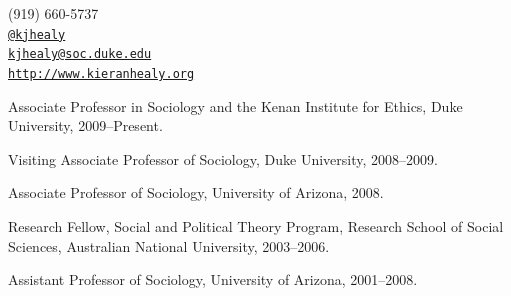 \documentclass[11pt,article,oneside]{memoir}
\makeatletter
\def\myemail{kjhealy@soc.duke.edu}
\def\myweb{http://www.kieranhealy.org}
\def\myphone{(919) 660-5737}
\def\mytwitter{@kjhealy}
\makeatother
\begin{document}
\begin{minipage}[t]{2.95in}
  
\end{minipage}
\hfill     
\hfill
\begin{minipage}[t]{1.3in}
  \flushright \footnotesize  \addressblock \myphone \, \faPhone \\ 
  {\scriptsize  \texttt{\href{http://twitter.com/kjhealy}{\mytwitter}} \, \faTwitter }  \\ 
  {\scriptsize  \texttt{\href{mailto:\myemail}{\myemail}} \, \faEnvelope} \\
  {\scriptsize  \texttt{\href{\myweb}{\myweb}} \, \faGlobe}
\end{minipage}

\medskip

\reversemarginpar

\bigskip       


{}

\ind Associate Professor in Sociology and the Kenan Institute for Ethics, Duke University, 2009--Present.      

\ind Visiting Associate Professor of Sociology, Duke University, 2008--2009.

\ind Associate Professor of Sociology, University of Arizona, 2008.

\ind Research Fellow, Social and Political Theory Program,
Research School of Social Sciences, Australian National University, 2003--2006.

\ind Assistant Professor of Sociology, University of Arizona, 2001--2008.

\bigskip


\end{document}
